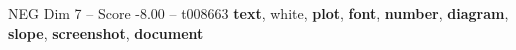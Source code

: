 \begin{textsample}{NEG Dim 7 – Score -8.00 – t008663}  \label{ex:f7_neg_004}
\textbf{text}, white, \textbf{plot}, \textbf{font}, \textbf{number}, \textbf{diagram}, \textbf{slope}, \textbf{screenshot}, \textbf{document}

\end{textsample}
